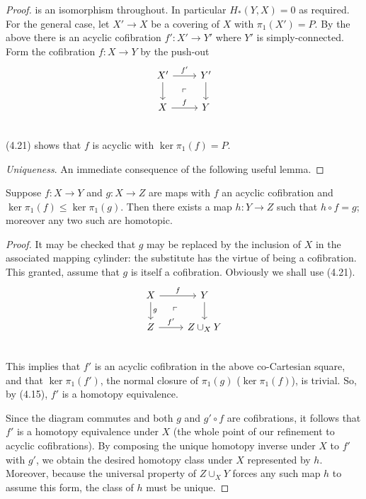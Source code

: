 \begin{proof}
is an isomorphism throughout. In particular $H_*(Y, X) = 0$ as required.
For the general case, let $X' \longrightarrow X$ be a covering of $X$ with $\pi_1(X')= P$. By the above there is an acyclic cofibration $f'\colon  X'\longrightarrow Y'$ where $Y'$ is simply-connected. Form the cofibration $f\colon   X \longrightarrow Y$ by the push-out
\[
 \begin{tikzcd}
 X' \arrow{d} \arrow{r}{f'}  \arrow[dr, phantom, "\ulcorner"]& Y' \arrow{d}\\
 X \arrow{r}{f} & Y\\
 \end{tikzcd}
 \]
(4.21) shows that $f$ is acyclic with $\ker \pi_1(f) = P$.

{\em Uniqueness}. An immediate consequence of the following useful lemma. 

\end{proof}
\begin{prop}
	Suppose $f\colon   X \longrightarrow Y$ and $g \colon   X \longrightarrow Z$ are maps with $f$ an acyclic cofibration and
$\ker \pi_1(f) \leqslant \ker \pi_1(g)$. Then there exists a map $h \colon   Y \longrightarrow Z$ such that $h\circ f = g$; moreover any two such are homotopic.
\end{prop}
\begin{proof}
It may be checked that $g$ may be replaced by the inclusion of $X$ in the associated mapping cylinder: the substitute has the virtue of being a cofibration. This granted, assume that $g$ is itself a cofibration. Obviously we shall use (4.21).
\[
 \begin{tikzcd}
 X \arrow{d}{g} \arrow{r}{f}  \arrow[dr, phantom, "\ulcorner"]& Y \arrow{d}\\
 Z \arrow{r}{f'} & Z\cup_X Y\\
 \end{tikzcd}
 \]
This implies that $f'$ is an acyclic cofibration in the above co-Cartesian square, and that $\ker \pi_1(f')$, the normal closure of $\pi_1(g)$ ($\ker \pi_1(f)$), is trivial. So, by (4.15), $f'$ is a homotopy equivalence.

Since the diagram commutes and both $g$ and $g'\circ f$ are cofibrations, it follows that $f'$ is a homotopy equivalence under $X$ (the whole point of our refinement to acyclic cofibrations). By composing the unique homotopy inverse under $X$ to $f'$ with $g'$, we obtain the desired homotopy class under $X$ represented by $h$. Moreover, because the universal property of $Z\cup_X Y$ forces any such map $h$ to
assume this form, the class of $h$ must be unique.

\end{proof}

